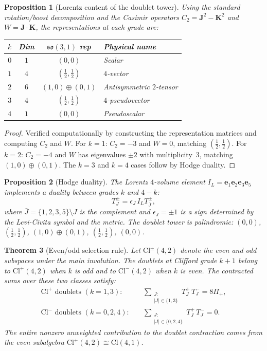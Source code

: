 \documentclass{birkjour}
\newtheorem{thm}{Theorem}[section]
\newtheorem{prop}[thm]{Proposition}
\theoremstyle{definition}
\theoremstyle{remark}
\numberwithin{equation}{section}
\newcommand{\Cl}{\mathrm{Cl}}
\newcommand{\so}{\mathfrak{so}}
\newcommand{\e}[1]{\bm{e}_{#1}}
\begin{document}
\begin{prop}[Lorentz content of the doublet tower]
\label{prop:lorentz}
Using the standard rotation/boost decomposition and the
Casimir operators
$C_2=\mathbf{J}^2-\mathbf{K}^2$ and
$W=\mathbf{J}\cdot\mathbf{K}$, the representations at
each grade are:
\begin{center}
\begin{tabular}{cccl}
\toprule
$k$ & \textbf{Dim}
& $\so(3,1)$ \textbf{rep}
& \textbf{Physical name}\\
\midrule
$0$ & $1$ & $(0,0)$ & Scalar\\
$1$ & $4$ & $(\tfrac12,\tfrac12)$
& $4$-vector\\
$2$ & $6$ & $(1,0)\oplus(0,1)$
& Antisymmetric $2$-tensor\\
$3$ & $4$ & $(\tfrac12,\tfrac12)$
& $4$-pseudovector\\
$4$ & $1$ & $(0,0)$ & Pseudoscalar\\
\bottomrule
\end{tabular}
\end{center}
\end{prop}

\begin{proof}
Verified computationally by constructing the representation
matrices and computing $C_2$ and $W$.
For $k=1$: $C_2=-3$ and $W=0$, matching
$(\tfrac12,\tfrac12)$.
For $k=2$: $C_2=-4$ and $W$ has eigenvalues $\pm2$ with
multiplicity~3, matching $(1,0)\oplus(0,1)$.
The $k=3$ and $k=4$ cases follow by Hodge duality.
\end{proof}

\begin{prop}[Hodge duality]\label{prop:hodge}
The Lorentz $4$-volume element
$I_L=\e{1}\e{2}\e{3}\e{5}$ implements a duality between
grades $k$ and $4-k$:
\begin{equation}\label{eq:hodge}
T^\pm_J=\epsilon_J\,I_L T^\pm_{\bar{J}},
\end{equation}
where $\bar{J}=\{1,2,3,5\}\setminus J$ is the complement
and $\epsilon_J=\pm1$ is a sign determined by the
Levi-Civita symbol and the metric.
The doublet tower is palindromic:
$(0,0)$, $(\tfrac12,\tfrac12)$,
$(1,0)\oplus(0,1)$, $(\tfrac12,\tfrac12)$, $(0,0)$.
\end{prop}

\begin{thm}[Even/odd selection rule]
\label{thm:even-odd}
Let $\Cl^\pm(4,2)$ denote the even and odd subspaces
under the main involution.
The doublets at Clifford grade $k+1$ belong to
$\Cl^+(4,2)$ when $k$ is odd and to $\Cl^-(4,2)$ when
$k$ is even.
The contracted sums over these two classes satisfy:
\begin{align}
\Cl^+\text{ doublets }(k=1,3):&\quad
\sum_{\substack{J:\\|J|\in\{1,3\}}}
T^+_J\,T^-_J=8\Pi_+,
\label{eq:even}\\
\Cl^-\text{ doublets }(k=0,2,4):&\quad
\sum_{\substack{J:\\|J|\in\{0,2,4\}}}
T^+_J\,T^-_J=0.
\label{eq:odd}
\end{align}
The entire nonzero unweighted contribution to the doublet
contraction comes from the even subalgebra
$\Cl^+(4,2)\cong\Cl(4,1)$.
\end{thm}
\end{document}
